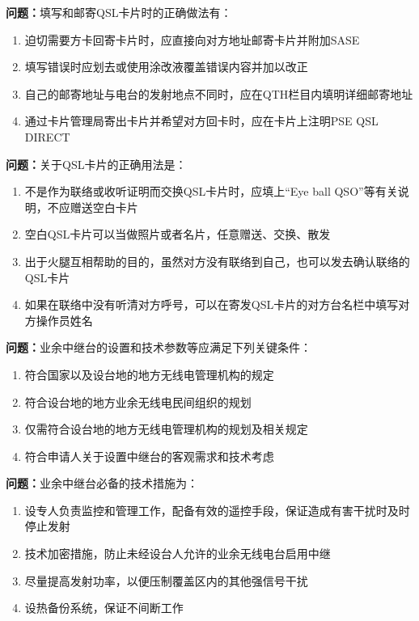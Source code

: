 \textbf{问题：}填写和邮寄QSL卡片时的正确做法有：
\begin{enumerate}[label=\Alph*), leftmargin=1cm]
	\item 迫切需要方卡回寄卡片时，应直接向对方地址邮寄卡片并附加SASE
	\item 填写错误时应划去或使用涂改液覆盖错误内容并加以改正
	\item 自己的邮寄地址与电台的发射地点不同时，应在QTH栏目内填明详细邮寄地址
	\item 通过卡片管理局寄出卡片并希望对方回卡时，应在卡片上注明PSE QSL DIRECT
\end{enumerate}

\textbf{问题：}关于QSL卡片的正确用法是：
\begin{enumerate}[label=\Alph*), leftmargin=1cm]
	\item 不是作为联络或收听证明而交换QSL卡片时，应填上“Eye ball QSO”等有关说明，不应赠送空白卡片
	\item 空白QSL卡片可以当做照片或者名片，任意赠送、交换、散发
	\item 出于火腿互相帮助的目的，虽然对方没有联络到自己，也可以发去确认联络的QSL卡片
	\item 如果在联络中没有听清对方呼号，可以在寄发QSL卡片的对方台名栏中填写对方操作员姓名
\end{enumerate}

\textbf{问题：}业余中继台的设置和技术参数等应满足下列关键条件：
\begin{enumerate}[label=\Alph*), leftmargin=1cm]
	\item 符合国家以及设台地的地方无线电管理机构的规定
	\item 符合设台地的地方业余无线电民间组织的规划
	\item 仅需符合设台地的地方无线电管理机构的规划及相关规定
	\item 符合申请人关于设置中继台的客观需求和技术考虑
\end{enumerate}

\textbf{问题：}业余中继台必备的技术措施为：
\begin{enumerate}[label=\Alph*), leftmargin=1cm]
	\item 设专人负责监控和管理工作，配备有效的遥控手段，保证造成有害干扰时及时停止发射
	\item 技术加密措施，防止未经设台人允许的业余无线电台启用中继
	\item 尽量提高发射功率，以便压制覆盖区内的其他强信号干扰
	\item 设热备份系统，保证不间断工作
\end{enumerate}

